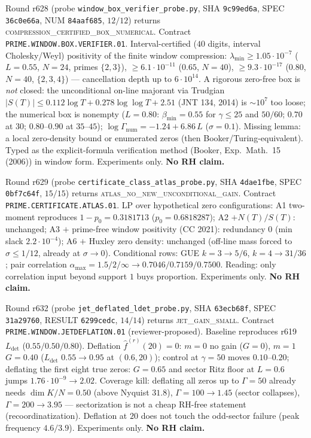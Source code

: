 \documentclass[11pt]{article}
\theoremstyle{definition}
\theoremstyle{remark}
\begin{document}
\noindent Round r628 (probe \texttt{window\_box\_verifier\_probe.py},
SHA \texttt{9c99ed6a}, SPEC \texttt{36c0e66a}, NUM
\texttt{84aaf685}, $12/12$) returns
\textsc{compression\_certified\_box\_numerical}.  Contract
\texttt{PRIME.WINDOW.BOX.VERIFIER.01}.  Interval-certified
($40$ digits, interval Cholesky/Weyl) positivity of the finite
window compression:
$\lambda_{\min}\ge 1.05\cdot10^{-7}$ ($L=0.55$, $N=24$, primes
$\{2,3\}$), $\ge 6.1\cdot10^{-11}$ ($0.65$, $N=40$),
$\ge 9.3\cdot10^{-17}$ ($0.80$, $N=40$, $\{2,3,4\}$) ---
cancellation depth up to $6\cdot10^{14}$.  A rigorous zero-free
box is \emph{not} closed: the unconditional on-line majorant via
Trudgian $\lvert S(T)\rvert\le 0.112\log T+0.278\log\log T+2.51$
(JNT 134, 2014) is $\sim 10^{7}$ too loose; the numerical box is
nonempty ($L=0.80$: $\beta_{\min}=0.55$ for $\gamma\le 25$ and
$50/60$; $0.70$ at $30$; $0.80$--$0.90$ at $35$--$45$);
$\log\Gamma_{\mathrm{num}}=-1.24+6.86\,L$ ($\sigma=0.1$).
Missing lemma: a local zero-density bound or enumerated zeros
(then Booker/Turing-equivalent).  Typed as the explicit-formula
verification method (Booker, Exp.\ Math.\ 15 (2006)) in window form.
Experiments only.
\textbf{No RH claim.}

\noindent Round r629 (probe \texttt{certificate\_class\_atlas\_probe.py},
SHA \texttt{4dae1fbe}, SPEC \texttt{0bf7c64f}, $15/15$) returns
\textsc{atlas\_no\_new\_unconditional\_gain}.  Contract
\texttt{PRIME.CERTIFICATE.ATLAS.01}.  LP over hypothetical zero
configurations: A1 two-moment reproduces $1-p_0=0.3181713$
($p_0=0.6818287$); A2 $+N(T)/S(T)$: unchanged; A3 $+$ prime-free
window positivity (CC 2021): redundancy $0$ (min slack
$2.2\cdot10^{-4}$); A6 $+$ Huxley zero density: unchanged
(off-line mass forced to $\sigma\le 1/12$, already at
$\sigma\to 0$).  Conditional rows: GUE $k=3\to 5/6$,
$k=4\to 31/36$; pair correlation $\alpha_{\max}=1.5/2/\infty\to
0.7046/0.7159/0.7500$.  Reading: only correlation input beyond
support $1$ buys proportion.  Experiments only.
\textbf{No RH claim.}

\noindent Round r632 (probe \texttt{jet\_deflated\_ldet\_probe.py},
SHA \texttt{63ecb68f}, SPEC \texttt{31a29760}, RESULT
\texttt{6299cedc}, $14/14$) returns \textsc{jet\_gain\_small}.
Contract \texttt{PRIME.WINDOW.JETDEFLATION.01} (reviewer-proposed).
Baseline reproduces r619 $L_{\mathrm{det}}$ ($0.55/0.50/0.80$).
Deflation $\hat f^{(r)}(20)=0$: $m=0$ no gain ($G=0$), $m=1$
$G=0.40$ ($L_{\mathrm{det}}$ $0.55\to 0.95$ at $(0.6,20)$);
control at $\gamma=50$ moves $0.10$--$0.20$; deflating the first
eight true zeros: $G=0.65$ and sector Ritz floor at $L=0.6$ jumps
$1.76\cdot10^{-9}\to 2.02$.  Coverage kill: deflating all zeros up
to $\Gamma=50$ already needs $\dim K/N=0.50$ (above Nyquist $31.8$),
$\Gamma=100\to 1.45$ (sector collapses), $\Gamma=200\to 3.95$ ---
sectorization is not a cheap RH-free statement
(recoordinatization).  Deflation at $20$ does not touch the
odd-sector failure (peak frequency $4.6/3.9$).  Experiments only.
\textbf{No RH claim.}
\end{document}
